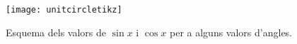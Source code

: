 \documentclass[12pt]{article}
\begin{document}
\begin{figure}
    \begin{minipage}[r]{0.7\textwidth}
      \texttt{[image: unitcircletikz]}
    \end{minipage}\hfill
    \begin{minipage}[l]{0.3\textwidth}
      \caption{
        Esquema dels valors de $\sin x$ i $\cos x$ per a alguns valors d'angles.
      } \label{Fig:unitcircle}
    \end{minipage}
  \end{figure}



\end{document}
